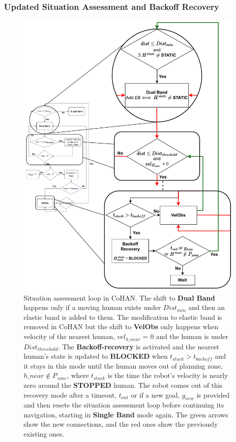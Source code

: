 \subsubsection{Updated Situation Assessment and Backoff Recovery}
\begin{figure}
    \centering
    \includegraphics[width=0.9\columnwidth]{images/chapter4/CoHAN_flowchart_final.pdf}
    \caption{Situation assessment loop in CoHAN. The shift to \textbf{Dual Band} happens only if a moving human exists under $Dist_{min}$ and then an elastic band is added to them. The modification to elastic band is removed in CoHAN but the shift to \textbf{VelObs} only happens when velocity of the nearest human, $vel_{h\_near}$ = 0 and the human is under $Dist_{threshold}$. The \textbf{Backoff-recovery} is activated and the nearest human's state is updated to \textbf{BLOCKED} when $t_{stuck}> t_{backoff}$ and it stays in this mode until the human moves out of planning zone, $h\_near \notin P_{zone}$, where $t_{stuck}$ is the time the robot's velocity is nearly zero around the \textbf{STOPPED} human. The robot comes out of this recovery mode after a timeout, $t_{out}$ or if a new goal, $g_{new}$ is provided and then resets the situation assessment loop before continuing its navigation, starting in \textbf{Single Band} mode again. The green arrows show the new connections, and the red ones show the previously existing ones.}
    \label{fig:cohan_SA}
\end{figure}

